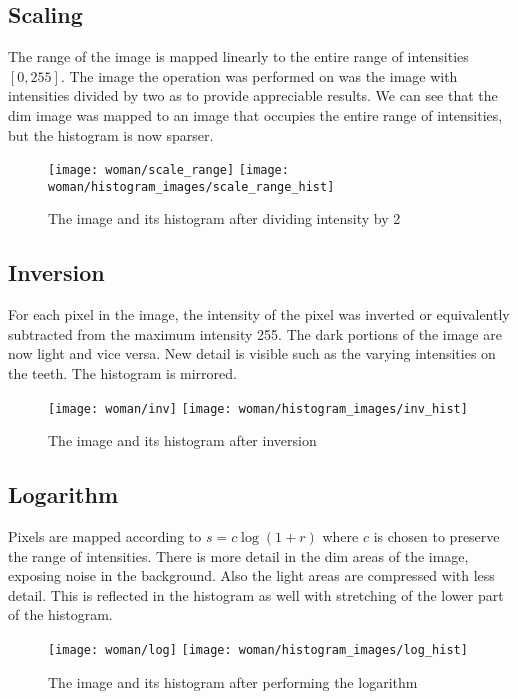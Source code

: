 \documentclass[12pt,letterpaper]{article}
\begin{document}
\vspace{-0.5cm}

\subsection{Scaling}
The range of the image is mapped linearly to the entire range of intensities $[0, 255]$. The image the operation was performed on was the image with intensities divided by two as to provide appreciable results. We can see that the dim image was mapped to an image that occupies the entire range of intensities, but the histogram is now sparser.
\begin{figure}[ht]
\centering
\texttt{[image: woman/scale\_range]} \hspace{0.5cm} \texttt{[image: woman/histogram\_images/scale\_range\_hist]}
\caption{\small{The image and its histogram after dividing intensity by 2}
\label{fig:scale} }
\end{figure}



\subsection{Inversion}
For each pixel in the image, the intensity of the pixel was inverted or equivalently subtracted from the maximum intensity 255. The dark portions of the image are now light and vice versa. New detail is visible such as the varying intensities on the teeth. The histogram is mirrored.

\begin{figure}[ht]
\centering
\texttt{[image: woman/inv]} \hspace{0.5cm} \texttt{[image: woman/histogram\_images/inv\_hist]}
\caption{\small{The image and its histogram after inversion}
\label{fig:inv} }
\end{figure}

\vspace{-0.5cm}

\subsection{Logarithm}
Pixels are mapped according to $s = c \log(1 + r)$ where $c$ is chosen to preserve the range of intensities. There is more detail in the dim areas of the image, exposing noise in the background. Also the light areas are compressed with less detail. This is reflected in the histogram as well with stretching of the lower part of the histogram.
\begin{figure}[ht]
\centering
\texttt{[image: woman/log]} \hspace{0.5cm} \texttt{[image: woman/histogram\_images/log\_hist]}
\caption{\small{The image and its histogram after performing the logarithm}
\label{fig:log} }
\end{figure}
\end{document}
